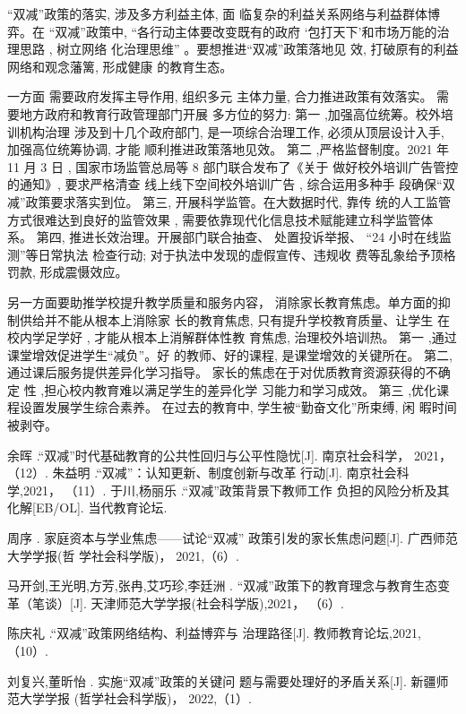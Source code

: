 \documentclass[a4paper]{book}
\numberwithin{equation}{chapter}
\theoremstyle{definition}
\begin{document}
“双减”政策的落实,
涉及多方利益主体,
面
临复杂的利益关系网络与利益群体博弈。在
“双减”政策中,
“各行动主体要改变既有的政府
‘包打天下’和市场万能的治理思路 ,
树立网络
化治理思维” \cite{ref6}。要想推进“双减”政策落地见
效,
打破原有的利益网络和观念藩篱,
形成健康
的教育生态。

一方面
需要政府发挥主导作用,
组织多元
主体力量,
合力推进政策有效落实。
需要地方政府和教育行政管理部门开展
多方位的努力:
第一 ,加强高位统筹。校外培训机构治理
涉及到十几个政府部门,
是一项综合治理工作,
必须从顶层设计入手,
加强高位统筹协调,
才能
顺利推进政策落地见效。
第二 ,严格监督制度。2021 年 11 月 3 日 ,
国家市场监管总局等 8 部门联合发布了《关于
做好校外培训广告管控的通知》,
要求严格清查
线上线下空间校外培训广告 ,
综合运用多种手
段确保“双减”政策要求落实到位。
第三,
开展科学监管。在大数据时代,
靠传
统的人工监管方式很难达到良好的监管效果 ,
需要依靠现代化信息技术赋能建立科学监管体
系。
第四,
推进长效治理。开展部门联合抽查、
处置投诉举报、
“24 小时在线监测”等日常执法
检查行动;
对于执法中发现的虚假宣传、违规收
费等乱象给予顶格罚款,
形成震慑效应。

另一方面要助推学校提升教学质量和服务内容，
消除家长教育焦虑。单方面的抑制供给并不能从根本上消除家
长的教育焦虑,
只有提升学校教育质量、让学生
在校内学足学好 ,
才能从根本上消解群体性教
育焦虑,
治理校外培训热。
第一 ,通过课堂增效促进学生“减负”。好
的教师、好的课程,
是课堂增效的关键所在。
第二,
通过课后服务提供差异化学习指导。
家长的焦虑在于对优质教育资源获得的不确定
性\cite{ref7} ,担心校内教育难以满足学生的差异化学
习能力和学习成效。
第三 ,优化课程设置发展学生综合素养。
在过去的教育中,
学生被“勤奋文化”所束缚,
闲
暇时间被剥夺。
\let\cleardoublepage\clearpage
\begin{thebibliography}{99}
     余晖 .“双减”时代基础教育的公共性回归与公平性隐忧[J]. 南京社会科学，
    2021，
    （12）.
     朱益明 .“双减”：认知更新、制度创新与改革
    行动[J]. 南京社会科学,2021，
    （11）.
     于川,杨丽乐 .“双减”政策背景下教师工作
    负担的风险分析及其化解[EB/OL]. 当代教育论坛.

     周序 . 家庭资本与学业焦虑——试论“双减”
    政策引发的家长焦虑问题[J]. 广西师范大学学报(哲
    学社会科学版)，
    2021,（6）.

     马开剑,王光明,方芳,张冉,艾巧珍,李廷洲 .
    “双减”政策下的教育理念与教育生态变革（笔谈）[J].
    天津师范大学学报(社会科学版),2021，
    （6）.

     陈庆礼 .“双减”政策网络结构、利益博弈与
    治理路径[J]. 教师教育论坛,2021,（10）.

     刘复兴,董昕怡 . 实施“双减”政策的关键问
    题与需要处理好的矛盾关系[J]. 新疆师范大学学报
    (哲学社会科学版)，
    2022,（1）.
\end{thebibliography}
\end{document}
